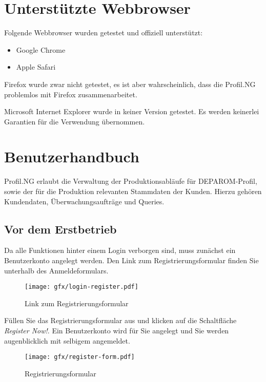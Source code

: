 \section{Unterstützte Webbrowser}

Folgende Webbrowser wurden getestet und offiziell unterstützt:

\begin{itemize}
  \item{Google Chrome}
  \item{Apple Safari}
\end{itemize}

Firefox wurde zwar nicht getestet, es ist aber wahrscheinlich, dass die Profil.NG
problemlos mit Firefox zusammenarbeitet.

Microsoft Internet Explorer wurde in keiner Version getestet. Es werden
keinerlei Garantien für die Verwendung übernommen.


\section{Benutzerhandbuch}

Profil.NG erlaubt die Verwaltung der Produktionsabläufe für DEPAROM-Profil,
sowie der für die Produktion relevanten Stammdaten der Kunden. Hierzu gehören
Kundendaten, Überwachungsaufträge und Queries.

\subsection{Vor dem Erstbetrieb}

Da alle Funktionen hinter einem Login verborgen sind, muss zunächst ein
Benutzerkonto angelegt werden. Den Link zum Registrierungsformular finden Sie
unterhalb des Anmeldeformulars.

\begin{figure}[H]
  \texttt{[image: gfx/login-register.pdf]}
  \caption{Link zum Registrierungsformular}
  \label{fig:login-register}
\end{figure}

Füllen Sie das Registrierungsformular aus und klicken auf die Schaltfläche
\textit{Register Now!}. Ein Benutzerkonto wird für Sie angelegt und Sie werden
augenblicklich mit selbigem angemeldet.

\begin{figure}[H]
  \texttt{[image: gfx/register-form.pdf]}
  \caption{Registrierungsformular}
  \label{fig:register-form}
\end{figure}

